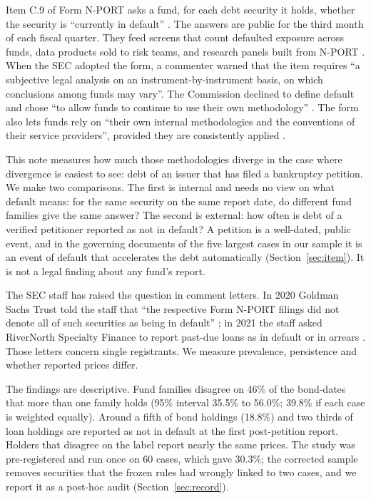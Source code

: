 \documentclass[11pt]{article}
\begin{document}
Item C.9 of Form N-PORT asks a fund, for each debt security it holds, whether the security is
``currently in default'' \citep{sec_nport_form}. The answers are public for the third month of each
fiscal quarter. They feed screens that count defaulted exposure across funds, data products sold to
risk teams, and research panels built from N-PORT \citep{cavani2025}. When the SEC adopted the form, a
commenter warned that the item requires ``a subjective legal analysis on an instrument-by-instrument
basis, on which conclusions among funds may vary''. The Commission declined to define default and
chose ``to allow funds to continue to use their own methodology'' \citep{sec_2016_release}. The form
also lets funds rely on ``their own internal methodologies and the conventions of their service
providers'', provided they are consistently applied \citep{sec_nport_form}.

This note measures how much those methodologies diverge in the case where divergence is easiest to
see: debt of an issuer that has filed a bankruptcy petition. We make two comparisons. The first is
internal and needs no view on what default means: for the same security on the same report date, do
different fund families give the same answer? The second is external: how often is debt of a verified
petitioner reported as not in default? A petition is a well-dated, public event, and in the governing
documents of the five largest cases in our sample it is an event of default that accelerates the debt
automatically (Section~\ref{sec:item}). It is not a legal finding about any fund's report.

The SEC staff has raised the question in comment letters. In 2020 Goldman Sachs Trust told the staff
that ``the respective Form N-PORT filings did not denote all of such securities as being in default''
\citep{corr_gs2020}; in 2021 the staff asked RiverNorth Specialty Finance to report past-due loans as in
default or in arrears \citep{corr_rivernorth2022}. Those letters concern single registrants. We measure
prevalence, persistence and whether reported prices differ.

The findings are descriptive. Fund families disagree on 46\% of the bond-dates that more than one
family holds (95\% interval 35.5\% to 56.0\%; 39.8\% if each case is weighted equally). Around a fifth of bond holdings (18.8\%) and two thirds of loan holdings are reported as not in
default at the first post-petition report. Holders that disagree on the label report nearly the same
prices. The study was pre-registered and run once on 60 cases, which gave 30.3\%; the corrected
sample removes securities that the frozen rules had wrongly linked to two cases, and we report it as a
post-hoc audit (Section~\ref{sec:record}).
\end{document}
